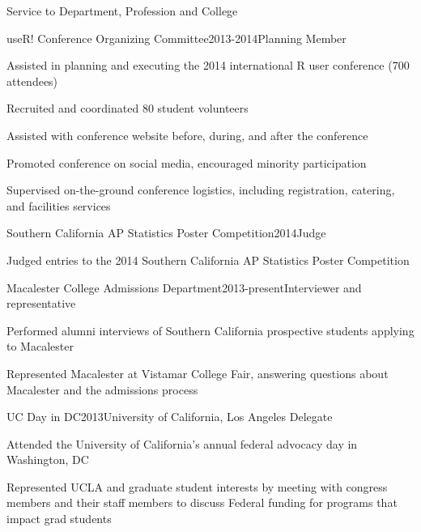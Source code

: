 \documentclass{resume} %
\begin{document}
\begin{rSection}{Service to Department, Profession and College}

\begin{rSubsection}{useR! Conference Organizing Committee}{}{2013-2014}{Planning Member}
\item Assisted in planning and executing the 2014 international R user conference (700 attendees)
\item Recruited and coordinated 80 student volunteers
\item Assisted with conference website before, during, and after the conference
\item Promoted conference on social media, encouraged minority participation
\item Supervised on-the-ground conference logistics, including registration, catering, and facilities services
\end{rSubsection}

\begin{rSubsection}{Southern California AP Statistics Poster Competition}{}{2014}{Judge}
\item Judged entries to the 2014 Southern California AP Statistics Poster Competition
\end{rSubsection}

\begin{rSubsection}{Macalester College Admissions Department}{}{2013-present}{Interviewer and representative}
\item Performed alumni interviews of Southern California prospective students applying to Macalester
\item Represented Macalester at Vistamar College Fair, answering questions about Macalester and the admissions process
\end{rSubsection}

\begin{rSubsection}{UC Day in DC}{}{2013}{University of California, Los Angeles Delegate}
\item Attended the University of California's annual federal advocacy day in Washington, DC
\item Represented UCLA and graduate student interests  by meeting with congress members and their staff members to discuss Federal funding for programs that impact grad students
\end{rSubsection}


\end{rSection}
\end{document}
